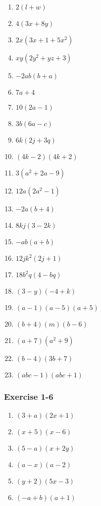 {\begin{multicols}{3}
\begin{enumerate}[noitemsep, label=\textbf{\arabic*}. ] 
\item $2(l + w)$%
\item $4(3x + 8y)$%
\item $2x(3x + 1 +5x^2)$%
\item $xy(2y^2 + yz + 3)$%
\item $-2ab(b + a)$%
\item $7a + 4$%
\item $10(2a - 1)$%
\item $3b(6a - c)$%
\item $6k(2j + 3q)$%
\item $(4k - 2)(4k + 2)$%
\item $3(a^2 + 2a - 9)$%
\item $12a( 2a^2 -1)$%
\item $-2a(b + 4)$%
\item $8kj(3 - 2k)$%
\item $-ab(a + b)$%
\item $12jk^2(2j+1)$%
\item $18b^2q(4 - bq)$%
\item $(3 - y)(-4 + k)$%
\item $(a - 1)(a - 5)(a + 5)$%
\item $(b + 4)(m)(b - 6)$%
\item $(a + 7)(a^2 + 9)$ %
\item $(b - 4)(3b + 7)$%
\item $(abc - 1)(abc + 1)$%
\end{enumerate}


\subsubsection*{Exercise 1-6} %


\begin{enumerate}[noitemsep, label=\textbf{\arabic*}. ] 
\item $(3 + a)(2x + 1)$%
\item $(x + 5)(x - 6)$%
\item $(5 - a)(x + 2y)$%
\item $(a - x)(a - 2)$%
\item $(y + 2)(5x - 3)$%
\item $(-a + b)(a + 1)$%
\end{enumerate}




\end{multicols}}
